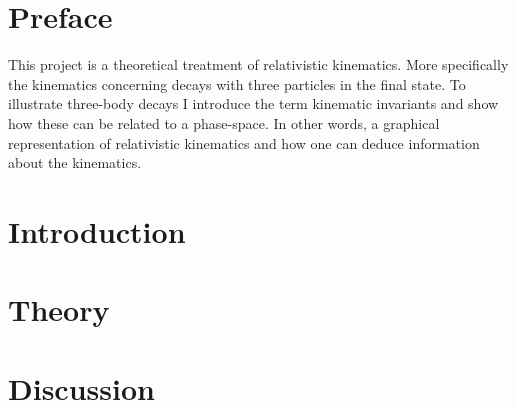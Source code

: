 
\newcommand{\projecttitle}{Kinematic invariants to illuminate 3 particle decays}


\newpage
\clearpage
{\addtolength{\beforechapskip}{-2\baselineskip}\tableofcontents*}


\chapter*{Preface} \label{Preface}
This project is a theoretical treatment of relativistic kinematics. More specifically the kinematics concerning decays with three particles in the final state. To illustrate three-body decays I introduce the term kinematic invariants and show how these can be related to a phase-space. In other words, a graphical representation of relativistic kinematics and how one can deduce information about the kinematics.
\chapter{Introduction} \label{Introduction}
\vspace{-1cm}


\chapter{Theory} \label{sec:theory}

\chapter{Discussion} \label{sec:discussion}


\begin{appendices} 
\chapter{}\label{Cosmology}

\end{appendices}
